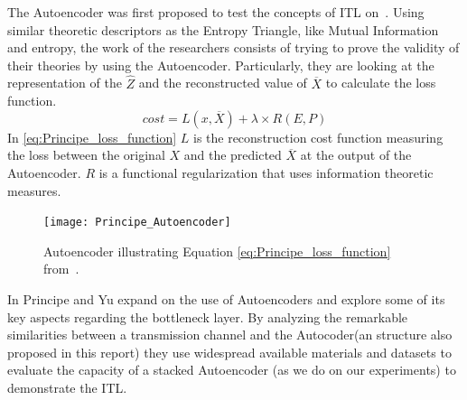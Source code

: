The Autoencoder was first proposed to test the concepts of ITL on~\cite{Santana_2016}. Using similar theoretic descriptors as the Entropy Triangle, like Mutual Information and entropy, the work of the researchers consists of trying to prove the validity of their theories by using the Autoencoder. Particularly, they are looking at the representation of the $\hat{Z}$ and the reconstructed value of $\overline{X}$ to calculate the loss function.
\begin{equation}
\label{eq:Principe_loss_function}
cost = L(x,\overline{X}) + \lambda \times R(E,P)
\end{equation}
In \eqref{eq:Principe_loss_function} $L$ is the reconstruction cost function measuring the loss between the original $X$ and the predicted $\overline{X}$ at the output of the Autoencoder. $R$ is a functional regularization that uses information theoretic measures.
\begin{figure}[H]
	\centering	
	\texttt{[image: Principe\_Autoencoder]}
	\caption{Autoencoder illustrating Equation \ref{eq:Principe_loss_function} from~\protect\cite{Santana_2016}.}
	\label{fig:figure_autoencoder2}
\end{figure} 



In \cite{Yu_2019} Principe and Yu expand on the use of Autoencoders and explore some of its key aspects regarding the bottleneck layer. By analyzing the remarkable similarities between a transmission channel and the Autocoder(an structure also proposed in this report) they use widespread available materials and datasets to evaluate the capacity of a stacked Autoencoder (as we do on our experiments) to demonstrate the ITL. 




